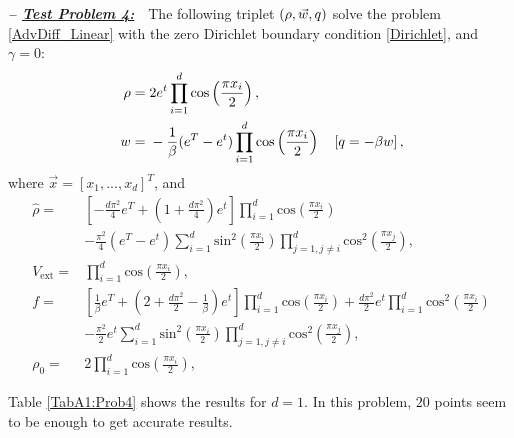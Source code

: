 \textbf{\emph{-- \underline{Test Problem 4:}}}~~The following triplet $(\rho,\vec{w},q)$ solve the problem \eqref{AdvDiff_Linear} with the zero Dirichlet boundary condition \eqref{Dirichlet}, and $\gamma =0$:
\begin{align*}
\ \rho={}&2e^{t}\prod_{i=1}^{d}\text{cos}\left(\frac{\pi{}x_i}{2}\right), \\
\ w={}&-\frac{1}{\beta}(e^{T}-e^{t})\prod_{i=1}^{d}\text{cos}\left(\frac{\pi{}x_i}{2}\right)\quad\left[\adj=-\beta{}w\right],
\end{align*}
where $\vec{x}=[x_1,...,x_d]^T$, and
\begin{align*}
\ \widehat{\rho}={}&\left[-\frac{d\pi^2}{4}e^{T}+\left(1+\frac{d\pi^2}{4}\right)e^{t}\right]\prod_{i=1}^{d}\text{cos}\left(\frac{\pi{}x_i}{2}\right) \\
\ &-\frac{\pi^2}{4}(e^{T}-e^{t})\sum_{i=1}^{d}\text{sin}^2\left(\frac{\pi{}x_i}{2}\right)\prod_{j=1,j\neq{}i}^{d}\text{cos}^2\left(\frac{\pi{}x_j}{2}\right), \\
\ V_{\text{ext}}={}&\prod_{i=1}^{d}\text{cos}\left(\frac{\pi{}x_i}{2}\right), \\
\ f={}&\left[\frac{1}{\beta}e^{T}+\left(2+\frac{d\pi^2}{2}-\frac{1}{\beta}\right)e^{t}\right]\prod_{i=1}^{d}\text{cos}\left(\frac{\pi{}x_i}{2}\right)+\frac{d\pi^{2}}{2}e^{t}\prod_{i=1}^{d}\text{cos}^2\left(\frac{\pi{}x_i}{2}\right) \\
\ &-\frac{\pi^2}{2}e^{t}\sum_{i=1}^{d}\text{sin}^2\left(\frac{\pi{}x_i}{2}\right)\prod_{j=1,j\neq{}i}^{d}\text{cos}^2\left(\frac{\pi{}x_j}{2}\right), \\
\ \rho_{0}={}&2\prod_{i=1}^{d}\text{cos}\left(\frac{\pi{}x_i}{2}\right),
\end{align*}

Table \ref{TabA1:Prob4} shows the results for $d=1$. In this problem, $20$ points seem to be enough to get accurate results.

